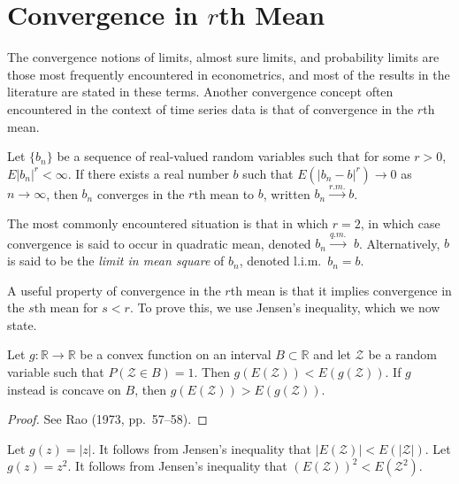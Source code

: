 \section{Convergence in $r$th Mean}\label{sec:conv-rth-mean}

The convergence notions of limits, almost sure limits, and probability limits
are those most frequently encountered in econometrics, and most of the
results in the literature are stated in these terms. Another convergence
concept often encountered in the context of time series data is that of
convergence in the $r$th mean.

\begin{definition}\label{def:conv-rth-mean}
Let $\{b_n\}$ be a sequence of real-valued random variables
such that for some $r > 0$, $E|b_n|^r < \infty$. If there exists a real number $b$ such
that $E(|b_n - b|^r) \to 0$ as $n \to \infty$, then $b_n$ converges in the $r$th mean to $b$,
written $b_n \xrightarrow{r.m.} b$.
\end{definition}

The most commonly encountered situation is that in which $r = 2$, in
which case convergence is said to occur in quadratic mean, denoted $b_n \xrightarrow{q.m.}$
$b$. Alternatively, $b$ is said to be the \emph{limit in mean square} of $b_n$, denoted
l.i.m.\ $b_n = b$.

A useful property of convergence in the $r$th mean is that it implies convergence in the $s$th mean for $s < r$. To prove this, we use Jensen's inequality,
which we now state.

\begin{proposition}\label{prop:jensen}
Let $g : \mathbb{R} \to \mathbb{R}$ be a convex
function on an interval $B \subset \mathbb{R}$ and let $\mathcal{Z}$ be a random variable such that
$P(\mathcal{Z} \in B) = 1$. Then $g(E(\mathcal{Z})) < E(g(\mathcal{Z}))$. If $g$ instead is concave on $B$,
then $g(E(\mathcal{Z})) > E(g(\mathcal{Z}))$.
\end{proposition}

\begin{proof}
See Rao (1973, pp.\ 57--58).
\end{proof}

\begin{example}\label{ex:jensen}
Let $g(z) = |z|$. It follows from Jensen's inequality that
$|E(\mathcal{Z})| < E(|\mathcal{Z}|)$. Let $g(z) = z^2$. It follows from Jensen's inequality that
$(E(\mathcal{Z}))^2 < E(\mathcal{Z}^2)$.
\end{example}

